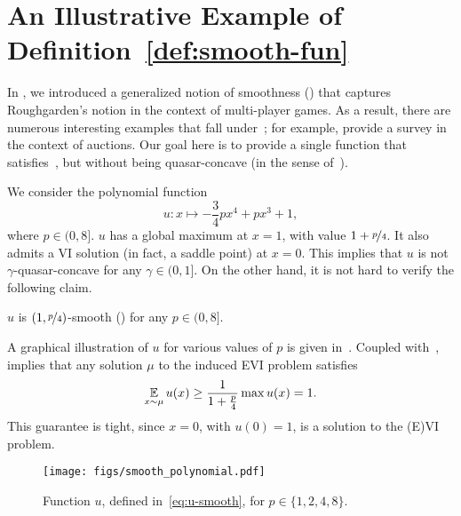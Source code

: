 \section{An Illustrative Example of Definition~\ref{def:smooth-fun}}
\label{sec:appendix-smooth}

In , we introduced a generalized notion of smoothness () that captures Roughgarden's notion in the context of multi-player games. As a result, there are numerous interesting examples that fall under~; for example, \citet{Roughgarden17:Price} provide a survey in the context of auctions. Our goal here is to provide a single function that satisfies~, but without being quasar-concave (in the sense of~).

\begin{example}
    We consider the polynomial function
    \begin{equation}
        \label{eq:u-smooth}
        u : x \mapsto - \frac{3}{4} p x^4 + p x^3 + 1,
    \end{equation}
    where $p \in (0, 8]$. $u$ has a global maximum at $x = 1$, with value $1 + \nicefrac{p}{4}$. It also admits a VI solution (in fact, a saddle point) at $x = 0$. This implies that $u$ is not $\gamma$-quasar-concave for any $\gamma \in (0, 1]$. On the other hand, it is not hard to verify the following claim.

    \begin{claim}
        \label{claim:u}
        $u$ is $(1, \nicefrac{p}{4})$-smooth () for any $p \in (0, 8]$.
    \end{claim}
    A graphical illustration of $u$ for various values of $p$ is given in~. Coupled with~,  implies that any solution $\mu$ to the induced EVI problem satisfies
    \begin{equation}
        \operatorname*{\mathbb E}_{ x \sim \mu} u(x) \geq \frac{1}{ 1 + \frac{p}{4}} \max u(x)=1.
    \end{equation}
    This guarantee is tight, since $x = 0$, with $u(0) = 1$, is a solution to the (E)VI problem.

    \begin{figure}[!ht]
        \centering
        \texttt{[image: figs/smooth\_polynomial.pdf]}
        \caption{Function $u$, defined in~\eqref{eq:u-smooth}, for $p \in \{1, 2, 4, 8\}$.}
        \label{fig:smooth_polynomial}
    \end{figure}
\end{example}

